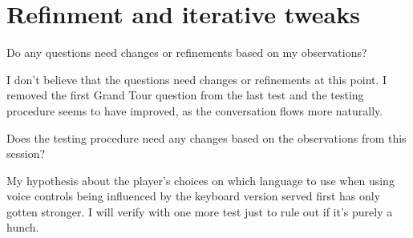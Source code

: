 \section{Refinment and iterative tweaks}

\begin{QandA}
    \item Do any questions need changes or refinements based on my observations?
    \begin{answered}
        I don't believe that the questions need changes or refinements at this point. I removed the first Grand Tour question from the last test and the testing procedure seems to have improved, as the conversation flows more naturally.
    \end{answered}

    \item Does the testing procedure need any changes based on the observations from this session?
    \begin{answered}
        My hypothesis about the player's choices on which language to use when using voice controls being influenced by the keyboard version served first has only gotten stronger. I will verify with one more test just to rule out if it's purely a hunch.
    \end{answered}
\end{QandA}